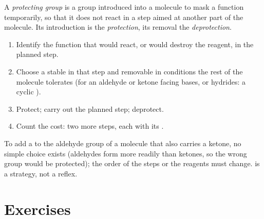 \begin{definition}\label{def:b1:acetals-protection:protecting-group}
A \emph{protecting group} is a group introduced
into a molecule to mask a function temporarily, so that it does not react
in a step aimed at another part of the molecule. Its introduction is the
\emph{protection}, its removal the
\emph{deprotection}.
\end{definition}

\begin{method}\label{met:b1:acetals-protection:protect}
\begin{enumerate}
  \item Identify the function that would react, or would destroy the
        reagent, in the planned step.
  \item Choose a  stable in that step and removable in
        conditions the rest of the molecule tolerates (for an aldehyde or
        ketone facing bases,  or hydrides: a cyclic ).
  \item Protect; carry out the planned step; deprotect.
  \item Count the cost: two more steps, each with its .
\end{enumerate}
\end{method}

\begin{example}\label{ex:b1:acetals-protection:ketoester}
To add a  to the aldehyde group of a molecule that also
carries a ketone, no simple  choice exists (aldehydes form 
more readily than ketones, so the wrong group would be protected); the
order of the steps or the reagents must change.  is a
strategy, not a reflex.
\end{example}

\section{Exercises}

